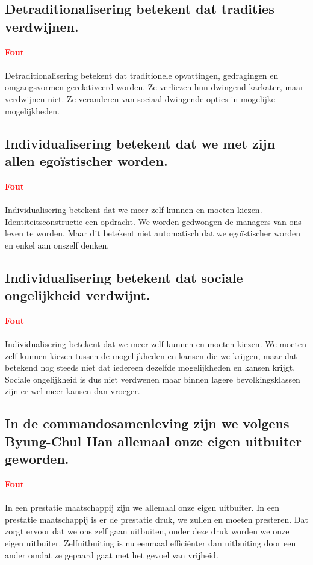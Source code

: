 \documentclass[11pt,a4paper,titlepage]{article}
\begin{document}
\subsection{Detraditionalisering betekent dat tradities verdwijnen.}
\textcolor{red}{\textbf{Fout}}\\\\
Detraditionalisering betekent dat traditionele opvattingen, gedragingen en omgangsvormen gerelativeerd worden. Ze verliezen hun dwingend karkater, maar verdwijnen niet. Ze veranderen van sociaal dwingende opties in mogelijke mogelijkheden.

\subsection{Individualisering betekent dat we met zijn allen egoïstischer worden.}
\textcolor{red}{\textbf{Fout}}\\\\
Individualisering betekent dat we meer zelf kunnen en moeten kiezen. Identiteitsconstructie een opdracht. We worden gedwongen de managers van ons leven te worden. Maar dit betekent niet automatisch dat we egoïstischer worden en enkel aan onszelf denken.

\subsection{Individualisering betekent dat sociale ongelijkheid verdwijnt.}
\textcolor{red}{\textbf{Fout}}\\\\
Individualisering betekent dat we meer zelf kunnen en moeten kiezen. We moeten zelf kunnen kiezen tussen de mogelijkheden en kansen die we krijgen, maar dat betekend nog steeds niet dat iedereen dezelfde mogelijkheden en kansen krijgt. Sociale ongelijkheid is dus niet verdwenen maar binnen lagere bevolkingsklassen zijn er wel meer kansen dan vroeger.

\subsection{In de commandosamenleving zijn we volgens Byung-Chul Han allemaal onze eigen uitbuiter geworden.}
\textcolor{red}{\textbf{Fout}}\\\\
In een prestatie maatschappij zijn we allemaal onze eigen uitbuiter. In een prestatie maatschappij is er de prestatie druk, we zullen en moeten presteren. Dat zorgt ervoor dat we ons zelf gaan uitbuiten, onder deze druk worden we onze eigen uitbuiter. Zelfuitbuiting is nu eenmaal efficiënter dan uitbuiting door een ander omdat ze gepaard gaat met het gevoel van vrijheid.
\end{document}
